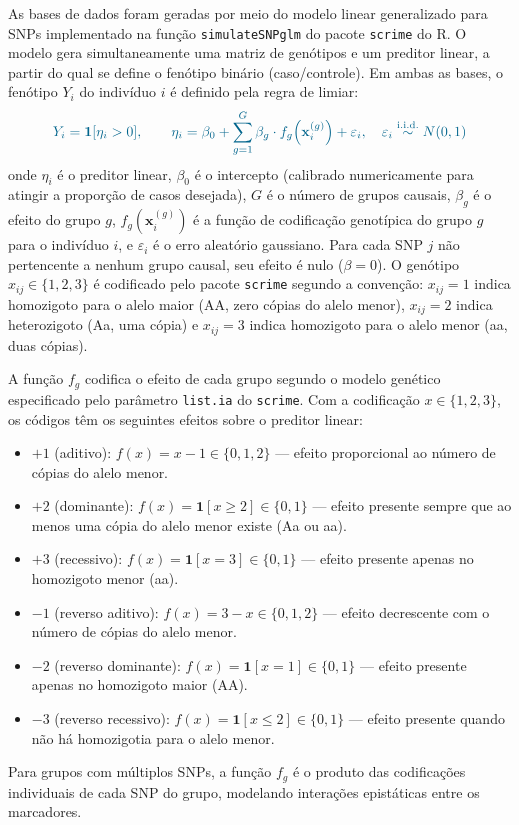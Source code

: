 \documentclass[12pt,a4paper]{article}
\newcommand{\novo}[1]{\textcolor{corNova}{#1}}
\begin{document}
\novo{As bases de dados foram geradas por meio do modelo linear generalizado para SNPs implementado na função \texttt{simulateSNPglm} do pacote \texttt{scrime} do R. O modelo gera simultaneamente uma matriz de genótipos e um preditor linear, a partir do qual se define o fenótipo binário (caso/controle). Em ambas as bases, o fenótipo $Y_i$ do indivíduo $i$ é definido pela regra de limiar:}
\[
  \novo{Y_i = \mathbf{1}[\eta_i > 0], \qquad
  \eta_i = \beta_0 + \sum_{g=1}^{G} \beta_g \cdot f_g\!\left(\mathbf{x}_i^{(g)}\right) + \varepsilon_i,
  \quad \varepsilon_i \overset{\text{i.i.d.}}{\sim} N(0,1)}
\]
\novo{onde $\eta_i$ é o preditor linear, $\beta_0$ é o intercepto (calibrado numericamente para atingir a proporção de casos desejada), $G$ é o número de grupos causais, $\beta_g$ é o efeito do grupo $g$, $f_g(\mathbf{x}_i^{(g)})$ é a função de codificação genotípica do grupo $g$ para o indivíduo $i$, e $\varepsilon_i$ é o erro aleatório gaussiano. Para cada SNP $j$ não pertencente a nenhum grupo causal, seu efeito é nulo ($\beta = 0$). O genótipo $x_{ij} \in \{1, 2, 3\}$ é codificado pelo pacote \texttt{scrime} segundo a convenção: $x_{ij} = 1$ indica homozigoto para o alelo maior (AA, zero cópias do alelo menor), $x_{ij} = 2$ indica heterozigoto (Aa, uma cópia) e $x_{ij} = 3$ indica homozigoto para o alelo menor (aa, duas cópias).}

\novo{A função $f_g$ codifica o efeito de cada grupo segundo o modelo genético especificado pelo parâmetro \texttt{list.ia} do \texttt{scrime}. Com a codificação $x \in \{1, 2, 3\}$, os códigos têm os seguintes efeitos sobre o preditor linear:}
\begin{itemize}
  \item \novo{$+1$ (aditivo): $f(x) = x - 1 \in \{0, 1, 2\}$ --- efeito proporcional ao número de cópias do alelo menor.}
  \item \novo{$+2$ (dominante): $f(x) = \mathbf{1}[x \geq 2] \in \{0, 1\}$ --- efeito presente sempre que ao menos uma cópia do alelo menor existe (Aa ou aa).}
  \item \novo{$+3$ (recessivo): $f(x) = \mathbf{1}[x = 3] \in \{0, 1\}$ --- efeito presente apenas no homozigoto menor (aa).}
  \item \novo{$-1$ (reverso aditivo): $f(x) = 3 - x \in \{0, 1, 2\}$ --- efeito decrescente com o número de cópias do alelo menor.}
  \item \novo{$-2$ (reverso dominante): $f(x) = \mathbf{1}[x = 1] \in \{0, 1\}$ --- efeito presente apenas no homozigoto maior (AA).}
  \item \novo{$-3$ (reverso recessivo): $f(x) = \mathbf{1}[x \leq 2] \in \{0, 1\}$ --- efeito presente quando não há homozigotia para o alelo menor.}
\end{itemize}
\novo{Para grupos com múltiplos SNPs, a função $f_g$ é o produto das codificações individuais de cada SNP do grupo, modelando interações epistáticas entre os marcadores.}
\end{document}
